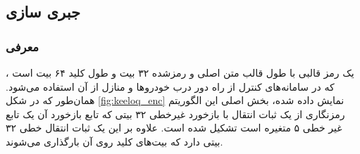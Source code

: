 \subsection{جبری سازی
	}
\subsubsection*{معرفی }
، 
یک رمز قالبی با طول قالب متن اصلی و رمزشده ۳۲ بیت و طول کلید ۶۴ بیت است که در سامانه‌های کنترل از راه دور درب خودروها و منازل از آن استفاده می‌شود.  همان‌طور که در شکل 
\ref{fig:keeloq_enc}
نمایش داده شده، بخش اصلی این الگوریتم رمزنگاری از یک ثبات انتقال با بازخورد غیر‌خطی ۳۲ بیتی که تابع بازخورد آن یک تابع غیر خطی ۵ متغیره‌ است تشکیل شده است. علاوه بر این یک ثبات انتقال خطی ۳۲ بیتی دارد که بیت‌های کلید روی آن بارگذاری می‌شوند. 

